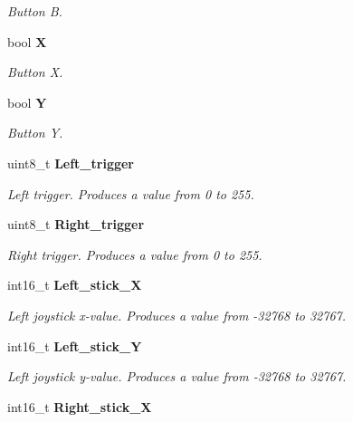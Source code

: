 \begin{DoxyCompactItemize}
\begin{DoxyCompactList}\small\item\em Button B. \end{DoxyCompactList}\item 
bool {\bf X}\label{struct_buttons_aab1bde286e010d81472b269b419806d6}

\begin{DoxyCompactList}\small\item\em Button X. \end{DoxyCompactList}\item 
bool {\bf Y}\label{struct_buttons_a1d79ec66791bea4323f4f857c48c2975}

\begin{DoxyCompactList}\small\item\em Button Y. \end{DoxyCompactList}\item 
uint8\-\_\-t {\bf Left\-\_\-trigger}\label{struct_buttons_aab887f94fef5bd12e3d14838a15c7a10}

\begin{DoxyCompactList}\small\item\em Left trigger. Produces a value from 0 to 255. \end{DoxyCompactList}\item 
uint8\-\_\-t {\bf Right\-\_\-trigger}\label{struct_buttons_a79bedbdbd5a48a621f7a6d8a06b82bf8}

\begin{DoxyCompactList}\small\item\em Right trigger. Produces a value from 0 to 255. \end{DoxyCompactList}\item 
int16\-\_\-t {\bf Left\-\_\-stick\-\_\-\-X}\label{struct_buttons_a301836b32a4bd9f8e4269df153eb55d7}

\begin{DoxyCompactList}\small\item\em Left joystick x-\/value. Produces a value from -\/32768 to 32767. \end{DoxyCompactList}\item 
int16\-\_\-t {\bf Left\-\_\-stick\-\_\-\-Y}\label{struct_buttons_a3fa918572febd2d9e75dbef1929cfe23}

\begin{DoxyCompactList}\small\item\em Left joystick y-\/value. Produces a value from -\/32768 to 32767. \end{DoxyCompactList}\item 
int16\-\_\-t {\bf Right\-\_\-stick\-\_\-\-X}\label{struct_buttons_a7fa6690fc1458901c72ef7997270fea7}


\end{DoxyCompactItemize}
